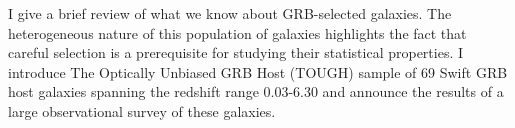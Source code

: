 


\bigskip



\bigskip

\noindent I give a brief review of what we know about GRB-selected galaxies. The heterogeneous nature of this population of galaxies highlights the fact that careful selection is a prerequisite for studying their statistical properties. I introduce The Optically Unbiased GRB Host (TOUGH) sample of 69 Swift GRB host galaxies spanning the redshift range 0.03-6.30 and announce the  results of a large observational survey of these galaxies.

